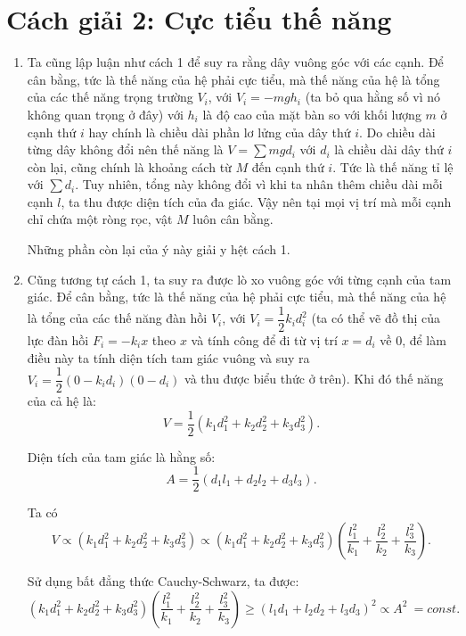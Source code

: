 \section{Cách giải 2: Cực tiểu thế năng}
\begin{enumerate}[label=(\alph*)]
\item Ta cũng lập luận như cách 1 để suy ra rằng dây vuông góc với các cạnh. Để cân bằng, tức là thế năng của hệ phải cực tiểu, mà thế năng của hệ là tổng của các thế năng trọng trường $V_i$, với $V_i=-mgh_i$ (ta bỏ qua hằng số vì nó không quan trọng ở đây) với $h_i$ là độ cao của mặt bàn so với khối lượng $m$ ở cạnh thứ $i$ hay chính là chiều dài phần lơ lửng của dây thứ $i$. Do chiều dài từng dây không đổi nên thế năng là $V=\sum mgd_i$ với $d_i$ là chiều dài dây thứ $i$ còn lại, cũng chính là khoảng cách từ $M$ đến cạnh thứ $i$. Tức là thế năng tỉ lệ với $\sum d_i$. Tuy nhiên, tổng này không đổi vì khi ta nhân thêm chiều dài mỗi cạnh $l$, ta thu được diện tích của đa giác. Vậy nên tại mọi vị trí mà mỗi cạnh chỉ chứa một ròng rọc, vật $M$ luôn cân bằng.

Những phần còn lại của ý này giải y hệt cách 1.
\item Cũng tương tự cách 1, ta suy ra được lò xo vuông góc với từng cạnh của tam giác. Để cân bằng, tức là thế năng của hệ phải cực tiểu, mà thế năng của hệ là tổng của các thế năng đàn hồi $V_i$, với $V_i=\dfrac{1}{2} k_id_i^2$ (ta có thể vẽ đồ thị của lực đàn hồi $F_i=-k_ix$ theo $x$ và tính công để đi từ vị trí $x=d_i$ về $0$, để làm điều này ta tính diện tích tam giác vuông và suy ra $V_i=\dfrac{1}{2} (0-k_id_i)(0-d_i)$ và thu được biểu thức ở trên). Khi đó thế năng của cả hệ là:
\begin{equation}
V=\dfrac{1}{2}(k_1d_1^2+k_2d_2^2+k_3d_3^2).
\end{equation}

Diện tích của tam giác là hằng số: \begin{equation}
A=\dfrac{1}{2}(d_1l_1+d_2l_2+d_3l_3).
\end{equation}

Ta có 
\begin{equation}
V \propto (k_1d_1^2+k_2d_2^2+k_3d_3^2) \propto (k_1d_1^2+k_2d_2^2+k_3d_3^2)(\dfrac{l_1^2}{k_1}+\dfrac{l_2^2}{k_2}+\dfrac{l_3^2}{k_3}).
\end{equation}

Sử dụng bất đẳng thức Cauchy-Schwarz, ta được:
\begin{equation}(k_1d_1^2+k_2d_2^2+k_3d_3^2)(\dfrac{l_1^2}{k_1}+\dfrac{l_2^2}{k_2}+\dfrac{l_3^2}{k_3})\ge(l_1d_1+l_2d_2+l_3d_3)^2\propto A^2\ = const.
\end{equation}


\end{enumerate}
